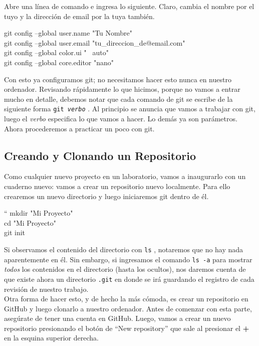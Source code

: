 \documentclass[10pt,letterpaper]{article}
\newcommand{\inlinecode}[1]{
\colorbox{light-gray}{\texttt{#1}}
}
\newenvironment{Code}
{
\begin{lrbox}{\selvestebox}%
\begin{minipage}{\dimexpr\columnwidth-2\fboxsep\relax}
\fontfamily{\ttdefault}\selectfont
}
{\end{minipage}\end{lrbox}%
\begin{center}
\colorbox{light-gray}{\usebox{\selvestebox}}
\end{center}
}
\begin{document}
Abre una l\'inea de comando e ingresa lo siguiente. Claro, cambia el nombre por el tuyo y la direcci\'on de email por la tuya tambi\'en.

\begin{Code}
git config --global user.name "Tu Nombre"\\
git config --global user.email "tu\_direccion\_de@email.com"\\
git config --global color.ui "\ \hspace*{-1em} auto"\\
git config --global core.editor "nano"
\end{Code}

Con esto ya configuramos git; no necesitamos hacer esto nunca en nuestro ordenador. Revisando r\'apidamente lo que hicimos, porque no vamos a entrar mucho en detalle, debemos notar que cada comando de git se escribe de la siguiente forma \inlinecode{git \emph{verbo}}. Al principio se anuncia que vamos a trabajar con git, luego el \emph{verbo} especifica lo que vamos a hacer. Lo dem\'as ya son par\'ametros. Ahora procederemos a practicar un poco con git.
\pagebreak
\subsection{Creando y Clonando un Repositorio}
Como cualquier nuevo proyecto en un laboratorio, vamos a inaugurarlo con un cuaderno nuevo: vamos a crear un repositorio nuevo localmente. Para ello crearemos un nuevo directorio y luego iniciaremos git dentro de \'el.

\begin{Code}``
mkdir "Mi Proyecto"\\
cd "Mi Proyecto"\\
git init
\end{Code}

Si observamos el contenido del directorio con \inlinecode{ls}, notaremos que no hay nada aparentemente en \'el. Sin embargo, si ingresamos el comando \inlinecode{ls -a} para mostrar \emph{todos} los contenidos en el directorio (hasta los ocultos), nos daremos cuenta de que existe ahora un directorio \inlinecode{.git} en donde se ir\'a guardando el registro de cada revisi\'on de nuestro trabajo.\\

Otra forma de hacer esto, y de hecho la m\'as c\'omoda, es crear un repositorio en GitHub y luego clonarlo a nuestro ordenador. Antes de comenzar con esta parte, aseg\'urate de tener una cuenta en GitHub. Luego, vamos a crear un nuevo repositorio presionando el bot\'on de ``New repository'' que sale al presionar el \textbf{+} en la esquina superior derecha.\\
\end{document}
